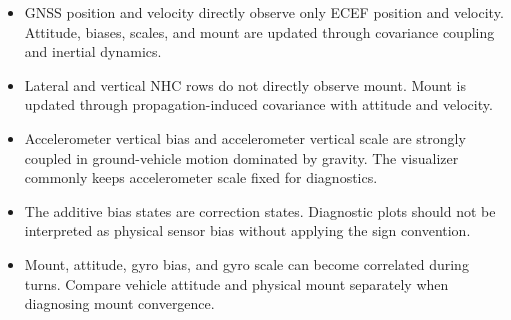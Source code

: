 \documentclass[11pt]{article}
\begin{document}
\begin{itemize}[leftmargin=1.5em]
\item GNSS position and velocity directly observe only ECEF position and
velocity. Attitude, biases, scales, and mount are updated through covariance
coupling and inertial dynamics.
\item Lateral and vertical NHC rows do not directly observe mount. Mount is
updated through propagation-induced covariance with attitude and velocity.
\item Accelerometer vertical bias and accelerometer vertical scale are strongly
coupled in ground-vehicle motion dominated by gravity. The visualizer commonly
keeps accelerometer scale fixed for diagnostics.
\item The additive bias states are correction states. Diagnostic plots should
not be interpreted as physical sensor bias without applying the sign convention.
\item Mount, attitude, gyro bias, and gyro scale can become correlated during
turns. Compare vehicle attitude and physical mount separately when diagnosing
mount convergence.
\end{itemize}
\end{document}
